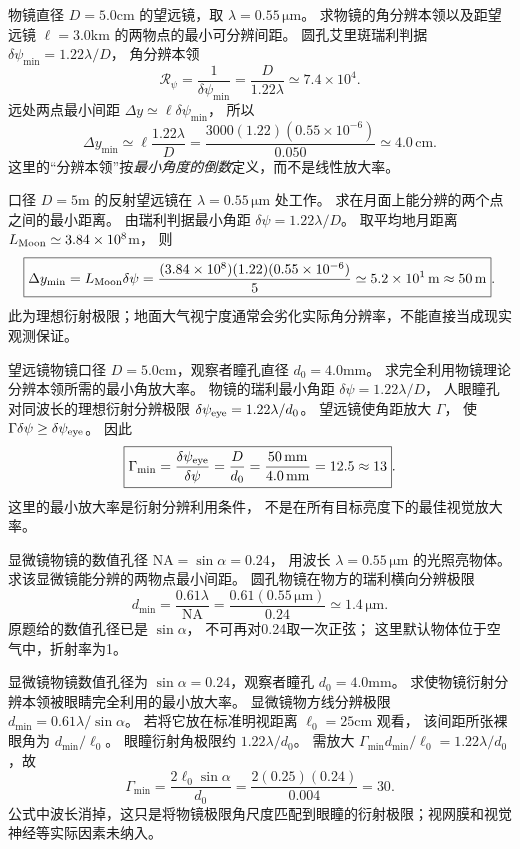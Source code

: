 物镜直径 $D=5.0$cm 的望远镜，取
$\lambda=0.55\,\mathrm{\mu m}$。
求物镜的角分辨本领以及距望远镜
$\ell=3.0$km 的两物点的最小可分辨间距。
\exsolution
圆孔艾里斑瑞利判据
$\delta\psi_{\min}=1.22\lambda/D$，
角分辨本领
\[
\boxed{\mathcal R_\psi=
\frac1{\delta\psi_{\min}}
=\frac D{1.22\lambda}
\simeq7.4\times10^4}.
\]
远处两点最小间距
$\Delta y\simeq\ell\delta\psi_{\min}$，
所以
\[
\boxed{\Delta y_{\min}
\simeq\ell\frac{1.22\lambda}{D}
=\frac{3000(1.22)(0.55\times10^{-6})}{0.050}
\simeq4.0\,\mathrm{cm}}.
\]
\excheck 这里的“分辨本领”按\emph{最小角度的倒数}定义，而不是线性放大率。

口径 $D=5$m 的反射望远镜在
$\lambda=0.55\,\mathrm{\mu m}$ 处工作。
求在月面上能分辨的两个点之间的最小距离。
\exsolution
由瑞利判据最小角距
$\delta\psi=1.22\lambda/D$。
取平均地月距离
$L_{\rm Moon}\simeq3.84\times10^8$m，
则
\[
\boxed{\Delta y_{\min}=
L_{\rm Moon}\delta\psi
=\frac{(3.84\times10^8)(1.22)(0.55\times10^{-6})}{5}
\simeq5.2\times10^1\,\mathrm m
\approx50\,\mathrm m}.
\]
\excheck 此为理想衍射极限；地面大气视宁度通常会劣化实际角分辨率，不能直接当成现实观测保证。

望远镜物镜口径
$D=5.0$cm，观察者瞳孔直径
$d_0=4.0$mm。
求完全利用物镜理论分辨本领所需的最小角放大率。
\exsolution
物镜的瑞利最小角距
$\delta\psi=1.22\lambda/D$，
人眼瞳孔对同波长的理想衍射分辨极限
$\delta\psi_{\rm eye}=1.22\lambda/d_0$。
望远镜使角距放大 $\Gamma$，
使
$\Gamma\delta\psi\ge\delta\psi_{\rm eye}$。
因此
\[
\boxed{\Gamma_{\min}=
\frac{\delta\psi_{\rm eye}}{\delta\psi}
=\frac D{d_0}
=\frac{50\,\mathrm{mm}}{4.0\,\mathrm{mm}}
=12.5\approx13}.
\]
\excheck 这里的最小放大率是衍射分辨利用条件，
不是在所有目标亮度下的最佳视觉放大率。

显微镜物镜的数值孔径
$\mathrm{NA}=\sin\alpha=0.24$，
用波长
$\lambda=0.55\,\mathrm{\mu m}$ 的光照亮物体。
求该显微镜能分辨的两物点最小间距。
\exsolution
圆孔物镜在物方的瑞利横向分辨极限
\[
\boxed{d_{\min}=
\frac{0.61\lambda}{\mathrm{NA}}
=\frac{0.61(0.55\,\mathrm{\mu m})}{0.24}
\simeq1.4\,\mathrm{\mu m}}.
\]
\excheck 原题给的数值孔径已是 $\sin\alpha$，
不可再对0.24取一次正弦；
这里默认物体位于空气中，折射率为1。

显微镜物镜数值孔径为
$\sin\alpha=0.24$，观察者瞳孔
$d_0=4.0$mm。
求使物镜衍射分辨本领被眼睛完全利用的最小放大率。
\exsolution
显微镜物方线分辨极限
$d_{\min}=0.61\lambda/\sin\alpha$。
若将它放在标准明视距离
$\ell_0=25$cm 观看，
该间距所张裸眼角为
$d_{\min}/\ell_0$。
眼瞳衍射角极限约
$1.22\lambda/d_0$。
需放大
$\Gamma_{\min}d_{\min}/\ell_0
=1.22\lambda/d_0$，故
\[
\boxed{\Gamma_{\min}=
\frac{2\ell_0\sin\alpha}{d_0}
=\frac{2(0.25)(0.24)}{0.004}
=30}.
\]
\excheck 公式中波长消掉，这只是将物镜极限角尺度匹配到眼瞳的衍射极限；视网膜和视觉神经等实际因素未纳入。

